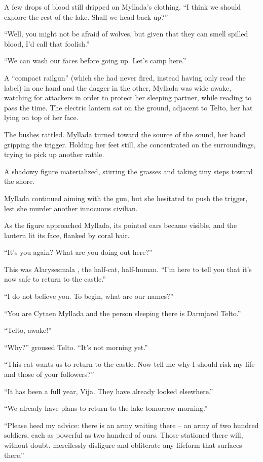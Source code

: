 A few drops of blood still dripped on Myllada's clothing. ``I think we should explore the rest of the lake. Shall we head back up?''

``Well, you might not be afraid of wolves, but given that they can smell spilled blood, I'd call that foolish.''

``We can wash our faces before going up. Let's camp here.''

\centeredstars

A ``compact railgun'' (which she had never fired, instead having only read the label) in one hand and the dagger in the other, Myllada was wide awake, watching for attackers in order to protect her sleeping partner, while reading to pass the time. The electric lantern sat on the ground, adjacent to Telto, her hat lying on top of her face.

The bushes rattled. Myllada turned toward the source of the sound, her hand gripping the trigger. Holding her feet still, she concentrated on the surroundings, trying to pick up another rattle.

A shadowy figure materialized, stirring the grasses and taking tiny steps toward the shore.

Myllada continued aiming with the gun, but she hesitated to push the trigger, lest she murder another innocuous civilian.

As the figure approached Myllada, its pointed ears became visible, and the lantern lit its face, flanked by coral hair.

``It's you again? What are you doing out here?''

This was Alarysesmala \yronsyncra, the half-cat, half-human. ``I'm here to tell you that it's now safe to return to the castle.''

``I do not believe you. To begin, what are our names?''

``You are Cytaen Myllada and the person sleeping there is Darmjarel Telto.''

``Telto, awake!''

``Why?'' groused Telto. ``It's not morning yet.''

``This cat wants us to return to the castle. Now tell me why I should risk my life and those of your followers?''

``It has been a full year, Vija. They have already looked elsewhere.''

``We already have plans to return to the lake tomorrow morning.''

``Please heed my advice: there is an army waiting there -- an army of two hundred soldiers, each as powerful as two hundred of ours. Those stationed there will, without doubt, mercilessly disfigure and obliterate any lifeform that surfaces there.''

